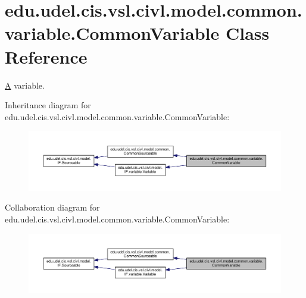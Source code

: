 \hypertarget{classedu_1_1udel_1_1cis_1_1vsl_1_1civl_1_1model_1_1common_1_1variable_1_1CommonVariable}{}\section{edu.\+udel.\+cis.\+vsl.\+civl.\+model.\+common.\+variable.\+Common\+Variable Class Reference}
\label{classedu_1_1udel_1_1cis_1_1vsl_1_1civl_1_1model_1_1common_1_1variable_1_1CommonVariable}


\hyperlink{structA}{A} variable.  




Inheritance diagram for edu.\+udel.\+cis.\+vsl.\+civl.\+model.\+common.\+variable.\+Common\+Variable\+:
\nopagebreak
\begin{figure}[H]
\begin{center}
\leavevmode
\includegraphics[width=350pt]{classedu_1_1udel_1_1cis_1_1vsl_1_1civl_1_1model_1_1common_1_1variable_1_1CommonVariable__inherit__graph}
\end{center}
\end{figure}


Collaboration diagram for edu.\+udel.\+cis.\+vsl.\+civl.\+model.\+common.\+variable.\+Common\+Variable\+:
\nopagebreak
\begin{figure}[H]
\begin{center}
\leavevmode
\includegraphics[width=350pt]{classedu_1_1udel_1_1cis_1_1vsl_1_1civl_1_1model_1_1common_1_1variable_1_1CommonVariable__coll__graph}
\end{center}
\end{figure}
